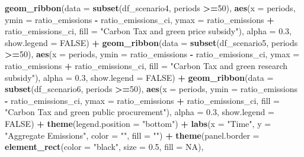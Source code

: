 \documentclass[
]{article}
\newenvironment{Shaded}{\begin{snugshade}}{\end{snugshade}}
\newcommand{\AttributeTok}[1]{\textcolor[rgb]{0.13,0.29,0.53}{#1}}
\newcommand{\ConstantTok}[1]{\textcolor[rgb]{0.56,0.35,0.01}{#1}}
\newcommand{\DecValTok}[1]{\textcolor[rgb]{0.00,0.00,0.81}{#1}}
\newcommand{\FloatTok}[1]{\textcolor[rgb]{0.00,0.00,0.81}{#1}}
\newcommand{\FunctionTok}[1]{\textcolor[rgb]{0.13,0.29,0.53}{\textbf{#1}}}
\newcommand{\NormalTok}[1]{#1}
\newcommand{\SpecialCharTok}[1]{\textcolor[rgb]{0.81,0.36,0.00}{\textbf{#1}}}
\newcommand{\StringTok}[1]{\textcolor[rgb]{0.31,0.60,0.02}{#1}}
\begin{document}
\begin{Shaded}
\begin{Highlighting}[]
  \FunctionTok{geom\_ribbon}\NormalTok{(}\AttributeTok{data =} \FunctionTok{subset}\NormalTok{(df\_scenario4, periods }\SpecialCharTok{\textgreater{}=}\DecValTok{50}\NormalTok{), }\FunctionTok{aes}\NormalTok{(}\AttributeTok{x =}\NormalTok{ periods, }\AttributeTok{ymin =}\NormalTok{ ratio\_emissions }\SpecialCharTok{{-}}\NormalTok{ ratio\_emissions\_ci, }\AttributeTok{ymax =}\NormalTok{ ratio\_emissions }\SpecialCharTok{+}\NormalTok{ ratio\_emissions\_ci, }\AttributeTok{fill =} \StringTok{"Carbon Tax and green price subsidy"}\NormalTok{), }\AttributeTok{alpha =} \FloatTok{0.3}\NormalTok{, }\AttributeTok{show.legend =} \ConstantTok{FALSE}\NormalTok{) }\SpecialCharTok{+}
  \FunctionTok{geom\_ribbon}\NormalTok{(}\AttributeTok{data =} \FunctionTok{subset}\NormalTok{(df\_scenario5, periods }\SpecialCharTok{\textgreater{}=}\DecValTok{50}\NormalTok{), }\FunctionTok{aes}\NormalTok{(}\AttributeTok{x =}\NormalTok{ periods, }\AttributeTok{ymin =}\NormalTok{ ratio\_emissions }\SpecialCharTok{{-}}\NormalTok{ ratio\_emissions\_ci, }\AttributeTok{ymax =}\NormalTok{ ratio\_emissions }\SpecialCharTok{+}\NormalTok{ ratio\_emissions\_ci, }\AttributeTok{fill =} \StringTok{"Carbon Tax and green research subsidy"}\NormalTok{), }\AttributeTok{alpha =} \FloatTok{0.3}\NormalTok{, }\AttributeTok{show.legend =} \ConstantTok{FALSE}\NormalTok{) }\SpecialCharTok{+}
  \FunctionTok{geom\_ribbon}\NormalTok{(}\AttributeTok{data =} \FunctionTok{subset}\NormalTok{(df\_scenario6, periods }\SpecialCharTok{\textgreater{}=}\DecValTok{50}\NormalTok{), }\FunctionTok{aes}\NormalTok{(}\AttributeTok{x =}\NormalTok{ periods, }\AttributeTok{ymin =}\NormalTok{ ratio\_emissions }\SpecialCharTok{{-}}\NormalTok{ ratio\_emissions\_ci, }\AttributeTok{ymax =}\NormalTok{ ratio\_emissions }\SpecialCharTok{+}\NormalTok{ ratio\_emissions\_ci, }\AttributeTok{fill =} \StringTok{"Carbon Tax and green public procurement"}\NormalTok{), }\AttributeTok{alpha =} \FloatTok{0.3}\NormalTok{, }\AttributeTok{show.legend =} \ConstantTok{FALSE}\NormalTok{) }\SpecialCharTok{+}
  \FunctionTok{theme}\NormalTok{(}\AttributeTok{legend.position =} \StringTok{"bottom"}\NormalTok{) }\SpecialCharTok{+}
  \FunctionTok{labs}\NormalTok{(}\AttributeTok{x =} \StringTok{"Time"}\NormalTok{, }\AttributeTok{y =} \StringTok{"Aggregate Emissions"}\NormalTok{, }\AttributeTok{color =} \StringTok{""}\NormalTok{, }\AttributeTok{fill =} \StringTok{""}\NormalTok{) }\SpecialCharTok{+}
  \FunctionTok{theme}\NormalTok{(}\AttributeTok{panel.border =} \FunctionTok{element\_rect}\NormalTok{(}\AttributeTok{color =} \StringTok{"black"}\NormalTok{, }\AttributeTok{size =} \FloatTok{0.5}\NormalTok{, }\AttributeTok{fill =} \ConstantTok{NA}\NormalTok{),}

\end{Highlighting}
\end{Shaded}
\end{document}
